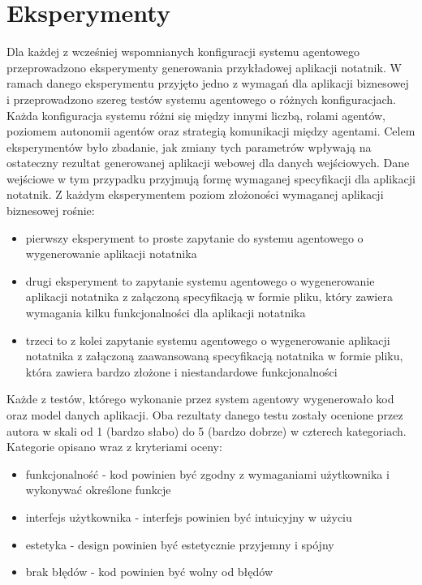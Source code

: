 \newpage
\section{Eksperymenty}
Dla każdej z wcześniej wspomnianych konfiguracji systemu agentowego przeprowadzono eksperymenty generowania przykładowej aplikacji notatnik. W ramach danego eksperymentu przyjęto jedno z wymagań dla aplikacji biznesowej i przeprowadzono szereg testów systemu agentowego o różnych konfiguracjach. Każda konfiguracja systemu różni się między innymi liczbą, rolami agentów, poziomem autonomii agentów oraz strategią komunikacji między agentami. Celem eksperymentów było zbadanie, jak zmiany tych parametrów wpływają na ostateczny rezultat generowanej aplikacji webowej dla danych wejściowych. Dane wejściowe w tym przypadku przyjmują formę wymaganej specyfikacji dla  aplikacji notatnik. Z każdym eksperymentem poziom złożoności wymaganej aplikacji biznesowej rośnie:
\begin{itemize}
  \item pierwszy eksperyment to proste zapytanie do systemu agentowego o wygenerowanie aplikacji notatnika
  \item drugi eksperyment to zapytanie systemu agentowego o wygenerowanie aplikacji notatnika z załączoną specyfikacją w formie pliku, który zawiera wymagania kilku funkcjonalności dla aplikacji notatnika
  \item trzeci to z kolei zapytanie systemu agentowego o wygenerowanie aplikacji notatnika z załączoną zaawansowaną specyfikacją notatnika w formie pliku, która zawiera bardzo złożone i niestandardowe funkcjonalności
\end{itemize}

Każde z testów, którego wykonanie przez system agentowy wygenerowało kod oraz model danych aplikacji. Oba rezultaty danego testu zostały ocenione przez autora w skali od 1 (bardzo słabo) do 5 (bardzo dobrze) w czterech kategoriach. Kategorie opisano wraz z kryteriami oceny:
\begin{itemize}
    \item funkcjonalność - kod powinien być zgodny z wymaganiami użytkownika i wykonywać określone funkcje
    \item interfejs użytkownika - interfejs powinien być intuicyjny w użyciu
    \item estetyka - design powinien być estetycznie przyjemny i spójny
    \item brak błędów - kod powinien być wolny od błędów
\end{itemize}

